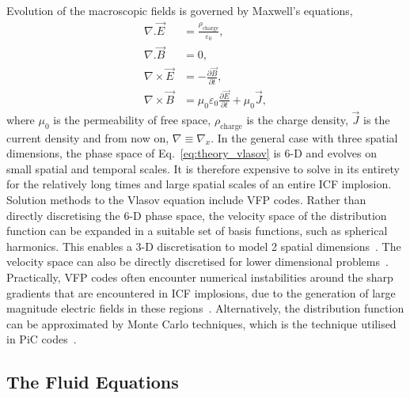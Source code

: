Evolution of the macroscopic fields is governed by Maxwell's equations,
\begin{align}
    \label{eq:theory_maxwell_eqs_1}
    \nabla.\vec{E} &= \frac{\rho_{\text{charge}}}{\varepsilon_0},\\
    \label{eq:theory_maxwell_eqs_2}
    \nabla.\vec{B} &= 0,\\
    \label{eq:theory_maxwell_eqs_3}
    \nabla \times \vec{E} &= -\frac{\partial \vec{B}}{\partial t},\\
    \label{eq:theory_maxwell_eqs_4}
    \nabla \times \vec{B} &= \mu_0 \varepsilon_0\frac{\partial \vec{E}}{\partial t} + \mu_0 \vec{J},
\end{align}
where $\mu_0$ is the permeability of free space, $\rho_{\text{charge}}$ is the charge density, $\vec{J}$ is the current density and from now on, $\nabla\equiv \nabla_x$.
In the general case with three spatial dimensions, the phase space of Eq.~\ref{eq:theory_vlasov} is 6-D and evolves on small spatial and temporal scales.
It is therefore expensive to solve in its entirety for the relatively long times and large spatial scales of an entire \ac{ICF} implosion.
Solution methods to the Vlasov equation include \ac{VFP} codes.
Rather than directly discretising the 6-D phase space, the velocity space of the distribution function can be expanded in a suitable set of basis functions, such as spherical harmonics.
This enables a 3-D discretisation to model 2 spatial dimensions~\cite{thomas_review_2012,kingham_implicit_2004}.
The velocity space can also be directly discretised for lower dimensional problems~\cite{taitano_eulerian_2021}.
Practically, \ac{VFP} codes often encounter numerical instabilities around the sharp gradients that are encountered in \ac{ICF} implosions, due to the generation of large magnitude electric fields in these regions~\cite{ridgers_inadequacy_2021}.
Alternatively, the distribution function can be approximated by Monte Carlo techniques, which is the technique utilised in \ac{PiC} codes~\cite{arber_contemporary_2015}.

\subsection{The Fluid Equations}%
\label{sec:theory_fluid}

